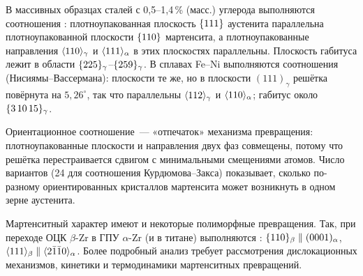 В массивных образцах сталей с 0,5--1,4\,\% (масс.) углерода выполняются
соотношения : плотноупакованная плоскость $\{111\}$
аустенита параллельна плотноупакованной плоскости $\{110\}$ мартенсита,
а плотноупакованные направления $\langle 110\rangle_\gamma$ и $\langle 111\rangle_\alpha$
в этих плоскостях параллельны. Плоскость габитуса лежит в области
$\{225\}_\gamma$--$\{259\}_\gamma$. В сплавах Fe--Ni выполняются
соотношения  (Нисиямы--Вассермана): плоскости те же, но в плоскости $(111)_\gamma$ решётка
повёрнута на $5{,}26^\circ$, так что параллельны $\langle 112\rangle_\gamma$ и
$\langle 110\rangle_\alpha$; габитус около $\{3\,10\,15\}_\gamma$.

\begin{smysl}
Ориентационное соотношение~— «отпечаток» механизма превращения:
плотноупакованные плоскости и направления двух фаз совмещены, потому что
решётка перестраивается сдвигом с минимальными смещениями атомов. Число
вариантов (24 для соотношения Курдюмова--Закса) показывает, сколько
по-разному ориентированных кристаллов мартенсита может возникнуть в одном
зерне аустенита.
\end{smysl}

Мартенситный характер имеют и некоторые полиморфные превращения. Так, при
переходе ОЦК $\beta$-Zr в ГПУ $\alpha$-Zr (и в титане) выполняются
: $\{110\}_\beta\parallel(0001)_\alpha$,
$\langle 111\rangle_\beta\parallel\langle 2\bar{1}\bar{1}0\rangle_\alpha$. Более подробный анализ
требует рассмотрения дислокационных механизмов, кинетики и термодинамики
мартенситных превращений.

